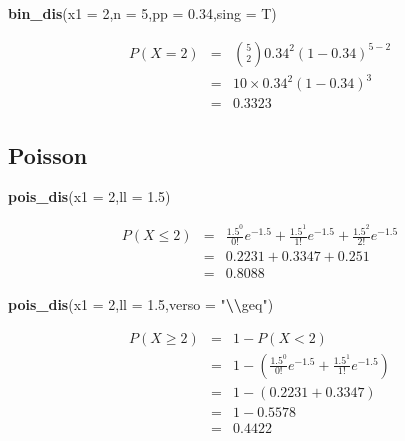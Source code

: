\documentclass[
  11pt,
]{book}
\newenvironment{Shaded}{\begin{snugshade}}{\end{snugshade}}
\newcommand{\AttributeTok}[1]{\textcolor[rgb]{0.13,0.29,0.53}{#1}}
\newcommand{\DecValTok}[1]{\textcolor[rgb]{0.00,0.00,0.81}{#1}}
\newcommand{\FloatTok}[1]{\textcolor[rgb]{0.00,0.00,0.81}{#1}}
\newcommand{\FunctionTok}[1]{\textcolor[rgb]{0.13,0.29,0.53}{\textbf{#1}}}
\newcommand{\NormalTok}[1]{#1}
\newcommand{\SpecialCharTok}[1]{\textcolor[rgb]{0.81,0.36,0.00}{\textbf{#1}}}
\newcommand{\StringTok}[1]{\textcolor[rgb]{0.31,0.60,0.02}{#1}}
\theoremstyle{mytheoremstyle}
\theoremstyle{mydefstyle}
\begin{document}
\begin{Shaded}
\begin{Highlighting}[]
\FunctionTok{bin\_dis}\NormalTok{(}\AttributeTok{x1 =} \DecValTok{2}\NormalTok{,}\AttributeTok{n =} \DecValTok{5}\NormalTok{,}\AttributeTok{pp =} \FloatTok{0.34}\NormalTok{,}\AttributeTok{sing =}\NormalTok{ T)}
\end{Highlighting}
\end{Shaded}

\normalsize 
\begin{eqnarray*}
      P( X = 2 ) &=& \binom{ 5 }{ 2 } 0.34 ^{ 2 }(1- 0.34 )^{ 5 - 2 } \\                 &=& 10 \times 0.34 ^{ 2 }(1- 0.34 )^{ 3 } \\                 &=& 0.3323 
   \end{eqnarray*}
\normalsize 

\subsection{Poisson}\label{poisson}

\begin{Shaded}
\begin{Highlighting}[]
\FunctionTok{pois\_dis}\NormalTok{(}\AttributeTok{x1 =} \DecValTok{2}\NormalTok{,}\AttributeTok{ll =} \FloatTok{1.5}\NormalTok{)}
\end{Highlighting}
\end{Shaded}

\begin{eqnarray*}
   P( X \leq 2 ) &=& \frac{ 1.5 ^{ 0 }}{ 0 !}e^{- 1.5 }+\frac{ 1.5 ^{ 1 }}{ 1 !}e^{- 1.5 }+\frac{ 1.5 ^{ 2 }}{ 2 !}e^{- 1.5 } \\                 &=& 0.2231+0.3347+0.251 \\                 &=& 0.8088 
\end{eqnarray*}

\begin{Shaded}
\begin{Highlighting}[]
\FunctionTok{pois\_dis}\NormalTok{(}\AttributeTok{x1 =} \DecValTok{2}\NormalTok{,}\AttributeTok{ll =} \FloatTok{1.5}\NormalTok{,}\AttributeTok{verso =} \StringTok{"}\SpecialCharTok{\textbackslash{}\textbackslash{}}\StringTok{geq"}\NormalTok{)}
\end{Highlighting}
\end{Shaded}

\begin{eqnarray*}
   P( X \geq 2 ) &=& 1-P( X < 2 ) \\                 &=& 1-\left( \frac{ 1.5 ^{ 0 }}{ 0 !}e^{- 1.5 }+\frac{ 1.5 ^{ 1 }}{ 1 !}e^{- 1.5 } \right)\\                 &=& 1-( 0.2231+0.3347 )\\                 &=& 1- 0.5578 \\                 &=&   0.4422 
\end{eqnarray*}
\end{document}
